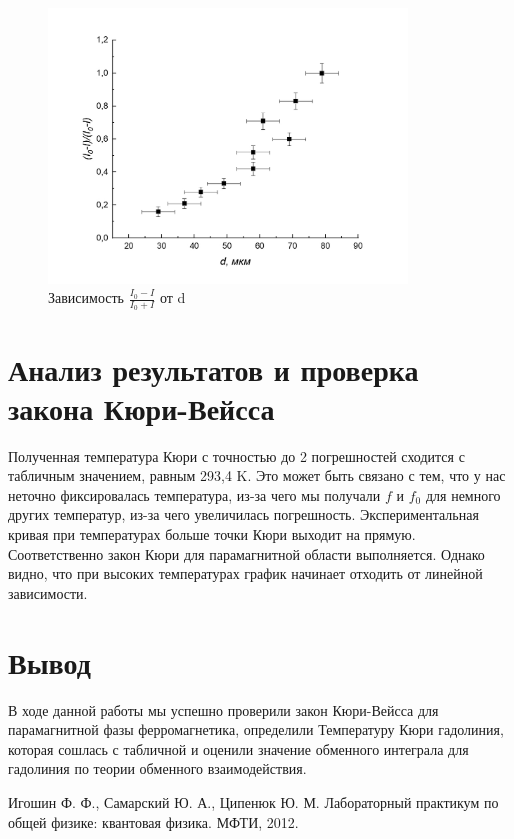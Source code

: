 \documentclass[a4paper, 12pt]{article}%
\begin{document}
\begin{figure}[h]
\begin{center}
\includegraphics[width = 0.85\textwidth]{7.jpg}
\caption{Зависимость $\frac{I_0 - I}{I_0+I}$ от d}
\end{center}
\end{figure}
\section{Анализ результатов и проверка закона Кюри-Вейсса}
Полученная температура Кюри с точностью до 2 погрешностей сходится с табличным значением, равным 293,4 K. Это может быть связано с тем, что у нас неточно фиксировалась температура, из-за чего мы получали $f$ и $f_0$ для немного других температур, из-за чего увеличилась погрешность. Экспериментальная кривая при температурах больше точки Кюри выходит на прямую. Соответственно закон Кюри для парамагнитной области выполняется. Однако видно, что при высоких температурах график начинает отходить от линейной зависимости.
\section{Вывод}
В ходе данной работы мы успешно проверили закон Кюри-Вейсса для парамагнитной фазы ферромагнетика, определили Температуру Кюри гадолиния, которая сошлась с табличной и оценили значение обменного интеграла для гадолиния по теории обменного взаимодействия.
\begin{thebibliography}{3}
Игошин Ф. Ф., Самарский Ю. А., Ципенюк Ю. М. Лабораторный практикум по общей физике: квантовая физика. МФТИ, 2012.
\end{thebibliography}
\end{document}
